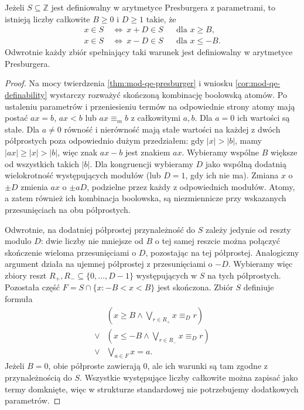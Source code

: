 \begin{wniosek}
\label{cor:mod-qe-presburger-periodic}
Jeżeli $S\subseteq\mathbb Z$ jest definiowalny
w arytmetyce Presburgera z parametrami, to istnieją
liczby całkowite $B\geq0$ i $D\geq1$ takie, że
\[
\begin{aligned}
x\in S&\ \Longleftrightarrow\ x+D\in S
&&\text{dla } x\geq B,\\
x\in S&\ \Longleftrightarrow\ x-D\in S
&&\text{dla } x\leq-B.
\end{aligned}
\]
Odwrotnie każdy zbiór spełniający taki warunek jest
definiowalny w arytmetyce Presburgera.
\end{wniosek}
\begin{proof}
Na mocy twierdzenia \ref{thm:mod-qe-presburger}
i wniosku \ref{cor:mod-qe-definability} wystarczy
rozważyć skończoną kombinację boolowską atomów.
Po ustaleniu parametrów i przeniesieniu termów
na odpowiednie strony atomy mają postać
$ax=b$, $ax<b$ lub $ax\equiv_m b$ z całkowitymi $a,b$.
Dla $a=0$ ich wartości są stałe. Dla $a\ne0$
równość i nierówność mają stałe wartości na każdej
z dwóch półprostych poza odpowiednio dużym
przedziałem: gdy $|x|>|b|$, mamy $|ax|\geq|x|>|b|$,
więc znak $ax-b$ jest znakiem $ax$.
Wybieramy wspólne $B$ większe od wszystkich takich
$|b|$. Dla kongruencji wybieramy $D$ jako wspólną
dodatnią wielokrotność występujących modułów
(lub $D=1$, gdy ich nie ma). Zmiana $x$ o $\pm D$
zmienia $ax$ o $\pm aD$, podzielne przez każdy
z odpowiednich modułów. Atomy, a zatem również ich
kombinacja boolowska, są niezmiennicze przy
wskazanych przesunięciach na obu półprostych.

Odwrotnie, na dodatniej półprostej przynależność do $S$
zależy jedynie od reszty modulo $D$: dwie liczby
nie mniejsze od $B$ o tej samej reszcie można połączyć
skończenie wieloma przesunięciami o $D$, pozostając
na tej półprostej. Analogiczny argument działa na
ujemnej półprostej z przesunięciami o $-D$.
Wybieramy więc zbiory reszt $R_+,R_-\subseteq
\{0,\ldots,D-1\}$ występujących w $S$ na tych półprostych.
Pozostała część $F=S\cap\{x:-B<x<B\}$ jest skończona.
Zbiór $S$ definiuje formuła
\[
\begin{aligned}
 &(x\geq B\land\bigvee_{r\in R_+}x\equiv_D r)\\
 {}\lor{}&(x\leq-B\land\bigvee_{r\in R_-}x\equiv_D r)\\
 {}\lor{}&\bigvee_{a\in F}x=a .
\end{aligned}
\]
Jeżeli $B=0$, obie półproste zawierają $0$, ale ich
warunki są tam zgodne z przynależnością do $S$.
Wszystkie występujące liczby całkowite można zapisać
jako termy domknięte, więc w strukturze standardowej
nie potrzebujemy dodatkowych parametrów.
\end{proof}

